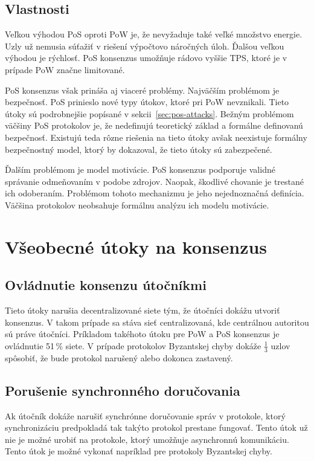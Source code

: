 \subsection{Vlastnosti}

Veľkou výhodou PoS oproti PoW je, že nevyžaduje také veľké množstvo energie. Uzly už nemusia súťažiť v riešení výpočtovo náročných úloh. Ďalšou veľkou výhodou je rýchlosť. PoS konsenzus umožňuje rádovo vyššie TPS, ktoré je v prípade PoW značne limitované.~\cite{leporeConsensus, nguyenPos}

PoS konsenzus však prináša aj viaceré problémy. Najväčším problémom je bezpečnosť. PoS prinieslo nové typy útokov, ktoré pri PoW nevznikali. Tieto útoky sú podrobnejšie popísané v sekcii~\ref{sec:pos-attacks}. Bežným problémom väčšiny PoS protokolov je, že nedefinujú teoretický základ a formálne definovanú bezpečnosť. Existujú teda rôzne riešenia na tieto útoky avšak neexistuje formálny bezpečnostný model, ktorý by dokazoval, že tieto útoky sú zabezpečené.

Ďalším problémom je model motivácie. PoS konsenzus podporuje validné správanie odmeňovaním v podobe zdrojov. Naopak, škodlivé chovanie je trestané ich odoberaním. Problémom tohoto mechanizmu je jeho nejednoznačná definícia. Väčšina protokolov neobsahuje formálnu analýzu ich modelu motivácie.~\cite{nguyenPos}

\section{Všeobecné útoky na konsenzus}

\subsection{Ovládnutie konsenzu útočníkmi}
Tieto útoky narušia decentralizované siete tým, že útočníci dokážu utvoriť konsenzus. V takom prípade sa stáva sieť centralizovaná, kde centrálnou autoritou sú práve útočníci. Príkladom takéhoto útoku pre PoW a PoS konsenzus je ovládnutie 51\,\% siete. V prípade protokolov Byzantskej chyby dokáže $\frac{1}{3}$ uzlov spôsobiť, že bude protokol narušený alebo dokonca zastavený.~\cite{homoliakBlockchain}

\subsection{Porušenie synchronného doručovania}

Ak útočník dokáže narušiť synchrónne doručovanie správ v protokole, ktorý synchronizáciu predpokladá tak takýto protokol prestane fungovať. Tento útok už nie je možné urobiť na protokole, ktorý umožňuje asynchronnú komunikáciu. Tento útok je možné vykonať napríklad pre protokoly Byzantskej chyby.~\cite{homoliakBlockchain}

